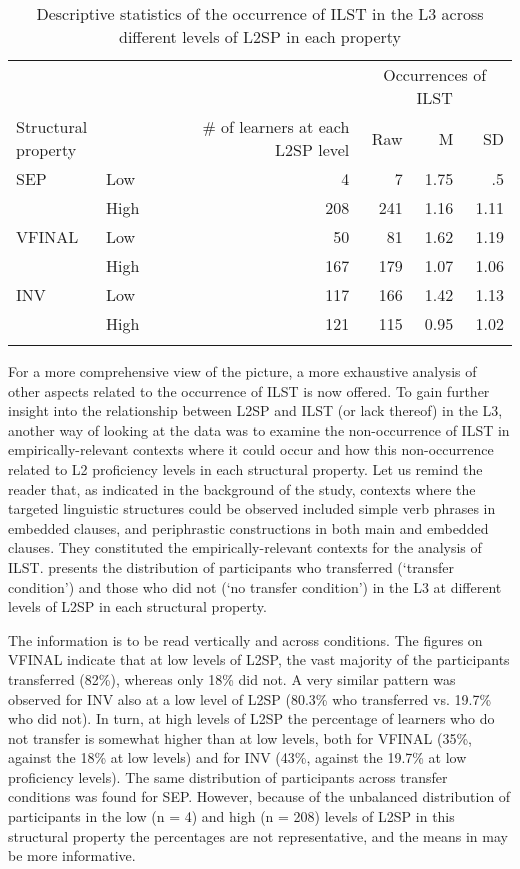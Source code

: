 \documentclass[output=paper,modfonts,nonflat, newtxmath]{langsci/langscibook}
\begin{document}
\begin{table}
\caption{Descriptive statistics of the occurrence of ILST in the L3 across different levels of L2SP in each property\label{tab:sanchez7:5}}
\begin{tabularx}{\textwidth}{XXrrrr}

\lsptoprule
 &	& & \multicolumn{3}{c}{Occurrences of ILST}\\
\cmidrule{4-6}
\multicolumn{2}{l}{Structural property} & \# of learners at each L2SP level & {Raw} & {M} & {SD}\\
\midrule
SEP & Low &  4 &  7 &  1.75 & .5 \\
 	& High & 208 & 241 & 1.16 & 1.11\\
\tablevspace
VFINAL & Low &  50 &  81 &  1.62 &  1.19\\
		& High & 167 & 179 & 1.07 & 1.06\\
\tablevspace
INV & Low & 117 &  166 &  1.42 &  1.13\\
	& High & 121 & 115 & 0.95 & 1.02\\
\lspbottomrule
\end{tabularx}
\end{table}

For a more comprehensive view of the picture, a more exhaustive analysis of other aspects related to the occurrence of ILST is now offered. To gain further insight into the relationship between L2SP and ILST (or lack thereof) in the L3, another way of looking at the data was to examine the non-occurrence of ILST in empirically-relevant contexts where it could occur and how this non-occurrence related to L2 proficiency levels in each structural property. Let us remind the reader that, as indicated in the background of the study, contexts where the targeted linguistic structures could be observed included simple verb phrases in embedded clauses, and periphrastic constructions in both main and embedded clauses. They constituted the empirically-relevant contexts for the analysis of ILST.  presents the distribution of participants who transferred (‘transfer condition’) and those who did not (‘no transfer condition’) in the L3 at different levels of L2SP in each structural property.

 The information is to be read vertically and across conditions. The figures on VFINAL indicate that at low levels of L2SP, the vast majority of the participants transferred (82\%), whereas only 18\% did not. A very similar pattern was observed for INV also at a low level of L2SP (80.3\% who transferred vs. 19.7\% who did not). In turn, at high levels of L2SP the percentage of learners who do not transfer is somewhat higher than at low levels, both for VFINAL (35\%, against the 18\% at low levels) and for INV (43\%, against the 19.7\% at low proficiency levels). The same distribution of participants across transfer conditions was found for SEP. However, because of the unbalanced distribution of participants in the low ({n} = 4) and high ({n} = 208) levels of L2SP in this structural property the percentages are not representative, and the means in  may be more informative.
\end{document}
